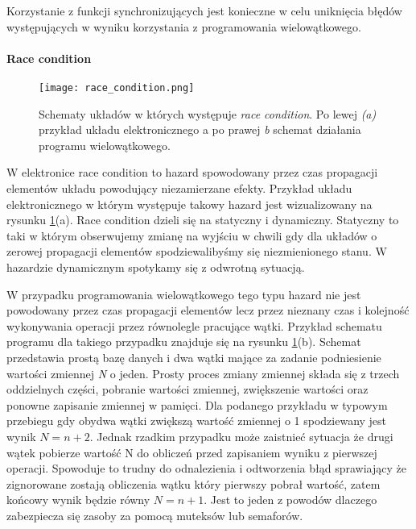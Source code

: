 Korzystanie z funkcji synchronizujących jest konieczne w celu uniknięcia błędów występujących w wyniku korzystania z programowania wielowątkowego.

\paragraph{Race condition}

\begin{figure}[t]
        \centering
        \texttt{[image: race\_condition.png]}
        \caption{Schematy układów w których występuje \textit{race condition}. Po lewej \textit{(a)} przykład układu elektronicznego a po prawej \textit{{b}} schemat działania programu wielowątkowego. }
        \label{race condition}
\end{figure}

W elektronice race condition to hazard spowodowany przez czas propagacji elementów układu powodujący niezamierzane efekty. Przykład układu elektronicznego w którym występuje takowy hazard jest wizualizowany na rysunku \ref{race condition}(a). 
Race condition dzieli się na statyczny i dynamiczny. Statyczny to taki w którym obserwujemy zmianę na wyjściu w chwili gdy dla układów o zerowej propagacji elementów spodziewalibyśmy się niezmienionego stanu.
W hazardzie dynamicznym spotykamy się z odwrotną sytuacją. 

W przypadku programowania wielowątkowego tego typu hazard nie jest powodowany przez czas propagacji elementów lecz przez nieznany czas i kolejność wykonywania operacji przez równolegle pracujące wątki. Przykład schematu programu dla takiego przypadku znajduje się na rysunku \ref{race condition}(b). Schemat przedstawia prostą bazę danych i dwa wątki mające za zadanie podniesienie wartości zmiennej \textit{N} o jeden.
Prosty proces zmiany zmiennej składa się z trzech oddzielnych części, pobranie wartości zmiennej, zwiększenie wartości oraz ponowne zapisanie zmiennej w pamięci. 
Dla podanego przykładu w typowym przebiegu gdy obydwa wątki zwiększą wartość zmiennej o 1 spodziewany jest wynik $N = n+2$. Jednak rzadkim przypadku może zaistnieć sytuacja że drugi wątek pobierze wartość N do obliczeń przed zapisaniem wyniku z pierwszej operacji. Spowoduje to trudny do odnalezienia i odtworzenia błąd sprawiający że zignorowane zostają obliczenia wątku który pierwszy pobrał wartość, zatem końcowy wynik będzie równy $N = n+1$.
Jest to jeden z powodów dlaczego zabezpiecza się zasoby za pomocą muteksów lub semaforów. 

